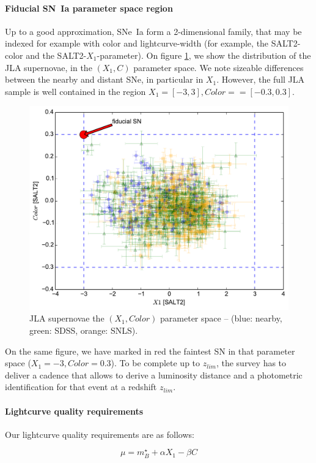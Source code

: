 \documentclass[\docopts]{\docclass}
\begin{document}
\paragraph{Fiducial SN~Ia parameter space region} Up to a good
approximation, SNe~Ia form a 2-dimensional family, that may be indexed
for example with color and lightcurve-width (for example, the
SALT2-color and the SALT2-$X_1$-parameter).  On figure
\ref{fig:jla_X1_C}, we show the distribution of the JLA supernovae, in
the $(X_1,C)$ parameter space. We note sizeable differences between the
nearby and distant SNe, in particular in $X_1$.  However, the full JLA
sample is well contained in the region $X_1 = [-3,3], Color= = [-0.3,
0.3]$. 

\begin{figure}[t]
\begin{center}
\includegraphics[width=0.75\linewidth]{sn_parameter_space.pdf}
\caption{JLA supernovae the $(X_1,Color)$ parameter space -- (blue:
  nearby, green: SDSS, orange: SNLS).  }
\label{fig:jla_X1_C}
\end{center}
\end{figure}

On the same figure, we have marked in red the faintest SN in that
parameter space ($X_1=-3, Color=0.3$). To be complete up to $z_{lim}$,
the survey has to deliver a cadence that allows to derive a luminosity
distance and a photometric identification for that event at a redshift
$z_{lim}$.

\paragraph{Lightcurve quality requirements} Our lightcurve quality
requirements are as follows:

\begin{equation}
  \mu = m^\star_B + \alpha X_1 - \beta C
\end{equation}
\end{document}
